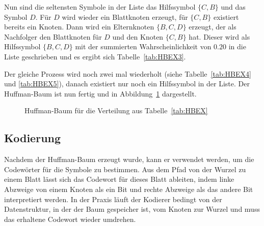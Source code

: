 \documentclass[twoside,11pt,a4paper]{article}
\theoremstyle{break}
\begin{document}
Nun sind die seltensten Symbole in der Liste das Hilfssymbol $\{C,
B\}$ und das Symbol $D$. Für $D$ wird wieder ein Blattknoten erzeugt,
für $\{C, B\}$ existiert bereits ein Knoten. Dann wird ein
Elternknoten $\{B, C, D\}$ erzeugt, der als Nachfolger den Blattknoten
für $D$ und den Knoten $\{C, B\}$ hat. Dieser wird als Hilfssymbol
$\{B, C, D\}$ mit der summierten Wahrscheinlichkeit von $0.20$ in die
Liste geschrieben und es ergibt sich Tabelle~\ref{tab:HBEX3}.

Der gleiche Prozess wird noch zwei mal wiederholt (siehe
Tabelle~\ref{tab:HBEX4} und \ref{tab:HBEX5}), danach existiert nur
noch ein Hilfssymbol in der Liste. Der Huffman-Baum ist nun fertig
und in Abbildung~\ref{fig:HBEX} dargestellt.

\begin{figure}[h]
\centering
{}
\caption{Huffman-Baum für die Verteilung aus Tabelle~\ref{tab:HBEX}} \label{fig:HBEX}
\end{figure}

\subsection{Kodierung}
Nachdem der Huffman-Baum erzeugt wurde, kann er verwendet werden, um
die Codewörter für die Symbole zu bestimmen. Aus dem Pfad von der
Wurzel zu einem Blatt lässt sich das Codewort für dieses Blatt
ableiten, indem linke Abzweige von einem Knoten als ein Bit und rechte
Abzweige als das andere Bit interpretiert werden. In der Praxis läuft
der Kodierer bedingt von der Datenstruktur, in der der Baum gespeicher
ist, vom Knoten zur Wurzel und muss das erhaltene Codewort wieder
umdrehen.
\end{document}
